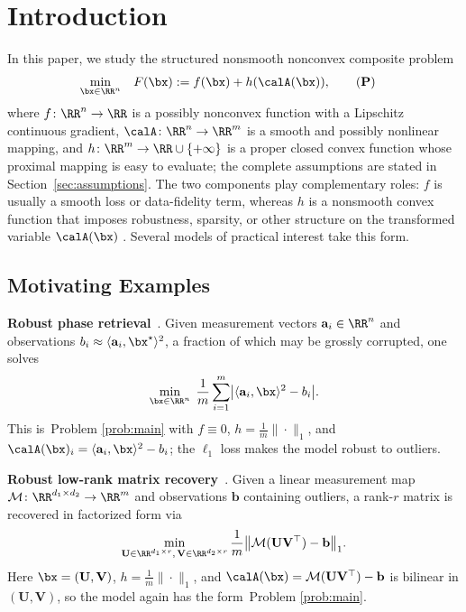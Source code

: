 \section{Introduction}
\label{sec:introduction}
In this paper, we study the structured nonsmooth nonconvex composite problem
\begin{align}
    \min_{\bx\in\RR^n}\quad & F(\bx) := f(\bx) + h(\calA(\bx)),
    \tag{\textbf{P}}
    \label{prob:main}
\end{align}
where $f\colon\RR^n\to\RR$ is a possibly nonconvex function with a Lipschitz
continuous gradient, $\calA\colon\RR^n\to\RR^m$ is a smooth and possibly nonlinear
mapping, and $h\colon\RR^m\to\RR\cup\{+\infty\}$ is a proper closed convex function
whose proximal mapping is easy to evaluate; the complete assumptions are stated in
Section~\ref{sec:assumptions}. The two components play complementary roles: $f$ is
usually a smooth loss or data-fidelity term, whereas $h$ is a nonsmooth convex function
that imposes robustness, sparsity, or other structure on the transformed variable
$\calA(\bx)$
\cite{charisopoulos2021low,markovsky2008structured,parekh2015convex}. Several models
of practical interest take this form.  
\subsection{Motivating Examples}
\textbf{Robust phase retrieval}~\cite{duchi2019solving}.
Given measurement vectors $\mathbf a_i\in\RR^n$ and observations
$b_i\approx\langle\mathbf a_i,\bx^\star\rangle^2$, a fraction of which may be grossly
corrupted, one solves
\begin{equation*}
  \min_{\bx\in\RR^n}\;\frac1m\sum_{i=1}^m
  \bigl|\langle\mathbf a_i,\bx\rangle^2-b_i\bigr|.
\end{equation*}
This is~Problem \eqref{prob:main} with $f\equiv0$, $h=\frac1m\|\cdot\|_1$, and
$\calA(\bx)_i=\langle\mathbf a_i,\bx\rangle^2-b_i$; the $\ell_1$ loss makes the
model robust to outliers.

\textbf{Robust low-rank matrix recovery}~\cite{charisopoulos2021low}.
Given a linear measurement map $\mathcal M\colon\RR^{d_1\times d_2}\to\RR^m$ and
observations $\mathbf b$ containing outliers, a rank-$r$ matrix is recovered in
factorized form via
\begin{equation*}
  \min_{\mathbf U\in\RR^{d_1\times r},\,\mathbf V\in\RR^{d_2\times r}}
  \frac1m\bigl\|\mathcal M(\mathbf U\mathbf V^\top)-\mathbf b\bigr\|_1.
\end{equation*}
Here $\bx=(\mathbf U,\mathbf V)$, $h=\frac1m\|\cdot\|_1$, and
$\calA(\bx)=\mathcal M(\mathbf U\mathbf V^\top)-\mathbf b$ is bilinear in
$(\mathbf U,\mathbf V)$, so the model again has the form~Problem \eqref{prob:main}.

